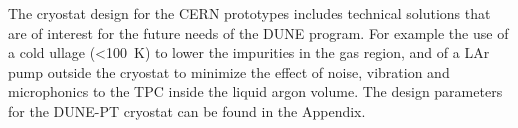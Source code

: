 
%
The cryostat design for the CERN prototypes includes technical solutions that are of interest for the future needs of the DUNE program. For example the use of a cold ullage (\textless  100~K) to lower the impurities in the gas region, and of a LAr pump outside the cryostat to minimize the effect of noise, vibration and microphonics to the TPC inside the liquid argon volume.
%
The design parameters for the DUNE-PT cryostat can be found in the Appendix.

